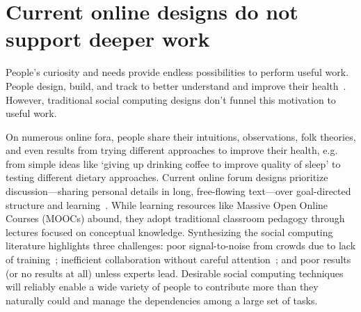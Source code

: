 \section {Current online designs do not support deeper work}
People’s curiosity and needs provide endless possibilities to perform useful work. People design, build, and track to better understand and improve their health~\cite{DanaLewis}. However, traditional social computing designs don’t funnel this motivation to useful work. 

On numerous online fora, people share their intuitions, observations, folk theories, and even results from trying different approaches to improve their health, e.g. from simple ideas like ‘giving up drinking coffee to improve quality of sleep’ to testing different dietary approaches. 
Current online forum designs prioritize discussion---sharing personal details in long, free-flowing text---over goal-directed structure and learning~\cite{Thomas2002}. While learning resources like Massive Open Online Courses (MOOCs) abound, they adopt traditional classroom pedagogy through lectures focused on conceptual knowledge. Synthesizing the social computing literature highlights three challenges: poor signal-to-noise from crowds due to lack of training~\cite{Doroudi2016a}; inefficient collaboration without careful attention~\cite{Resnick2011}; and poor results (or no results at all) unless experts lead. Desirable social computing techniques will reliably enable a wide variety of people to contribute more than they naturally could and manage the dependencies among a large set of tasks. 





